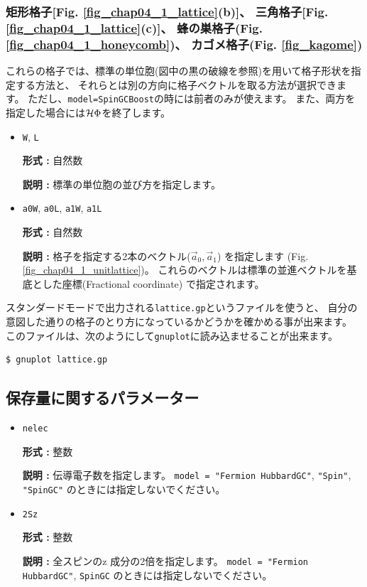 \subsubsection{矩形格子[Fig. \ref{fig_chap04_1_lattice}(b)]、 
三角格子[Fig. \ref{fig_chap04_1_lattice}(c)]、
蜂の巣格子(Fig. \ref{fig_chap04_1_honeycomb})、
カゴメ格子(Fig. \ref{fig_kagome})}

これらの格子では、標準の単位胞(図中の黒の破線を参照)を用いて格子形状を指定する方法と、
それらとは別の方向に格子ベクトルを取る方法が選択できます。
ただし、\verb|model=SpinGCBoost|の時には前者のみが使えます。
また、両方を指定した場合には$\mathcal{H} \Phi$を終了します。

\begin{itemize}

\item \verb|W|, \verb|L|

{\bf 形式 :} 自然数

{\bf 説明 :} 標準の単位胞の並び方を指定します。

\item \verb|a0W|, \verb|a0L|, \verb|a1W|, \verb|a1L|

{\bf 形式 :} 自然数

{\bf 説明 :} 格子を指定する2本のベクトル(${\vec a}_0, {\vec a}_1$)
を指定します (Fig. \ref{fig_chap04_1_unitlattice})。
これらのベクトルは標準の並進ベクトルを基底とした座標(Fractional coordinate)
で指定されます。

\end{itemize}

スタンダードモードで出力される\verb|lattice.gp|というファイルを使うと、
自分の意図した通りの格子のとり方になっているかどうかを確かめる事が出来ます。
このファイルは、次のようにして\verb|gnuplot|に読み込ませることが出来ます。
\begin{verbatim}
$ gnuplot lattice.gp
\end{verbatim}


\subsection{保存量に関するパラメーター}

\begin{itemize}
\item \verb|nelec|

{\bf 形式 :} 整数

{\bf 説明 :} 伝導電子数を指定します。
\verb|model = "Fermion HubbardGC"|, \verb|"Spin"|, \verb|"SpinGC"|
のときには指定しないでください。

\item \verb|2Sz|

{\bf 形式 :} 整数

{\bf 説明 :} 全スピンのz 成分の2倍を指定します。
\verb|model = "Fermion HubbardGC"|, \verb|SpinGC|
のときには指定しないでください。
\end{itemize}


